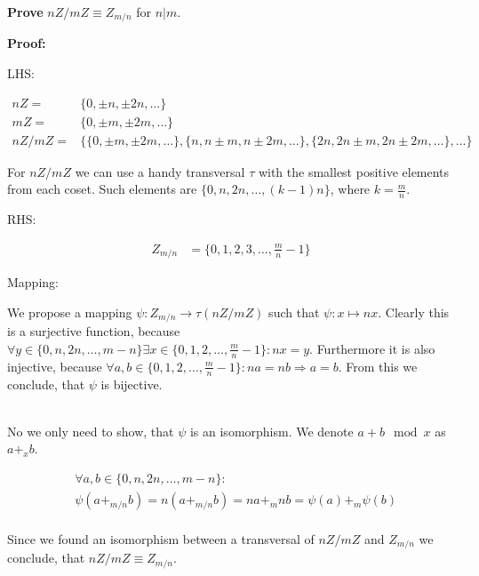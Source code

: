 \documentclass[a4paper]{article}
\begin{document}
\thispagestyle{fancy} %
{}

\textbf{Prove } $nZ/mZ \equiv Z_{m/n}$ for $n | m$.

\vspace{1cm}

\textbf{Proof:}


LHS:

\begin{align*}
	nZ = & \{0, \pm n, \pm 2n, \ldots\} \\
	mZ = & \{0, \pm m, \pm 2m, \ldots\} \\
	nZ/mZ = & \{ \{0, \pm m, \pm 2m, \ldots\}, \{n, n \pm m, n \pm 2m, \ldots\}, \{2n, 2n \pm m, 2n \pm 2m, \ldots\}, \ldots \}
\end{align*}

For $nZ/mZ$ we can use a handy transversal $\tau$ with the smallest positive elements from each coset. Such elements are $\{0, n, 2n, \ldots, (k-1)n\}$, where $k = \frac{m}{n}$. 

\vspace{1cm}

RHS:

\begin{align*}
	Z_{m/n} & = \{0, 1, 2, 3, \ldots, \frac{m}{n}-1\}
\end{align*}

\vspace{1cm}

Mapping:

We propose a mapping $\psi: Z_{m/n} \rightarrow \tau(nZ/mZ) $ such that $\psi: x \mapsto nx$. Clearly this is a surjective function, because $\forall y \in \{0, n, 2n, \ldots, m-n\} \exists x \in \{0, 1, 2, \ldots, \frac{m}{n}-1\}: nx = y$. Furthermore it is also injective, because $\forall a, b \in \{0, 1, 2, \ldots, \frac{m}{n}-1\}: na = nb \Rightarrow a=b$. From this we conclude, that $\psi$ is bijective.

\text{}\\

No we only need to show, that $\psi$ is an isomorphism. We denote $a + b \mod x$ as $a +_x b$.

\begin{align*}
 & \forall a,b \in \{0, n, 2n, \ldots, m-n\}: \\
 & \psi(a +_{m/n} b) = n(a+_{m/n} b) = na+_m nb = \psi(a) +_m \psi(b) \\
\end{align*}

Since we found an isomorphism between a transversal of $nZ/mZ$ and $Z_{m/n}$ we conclude, that $nZ/mZ \equiv Z_{m/n}$.
\end{document}
